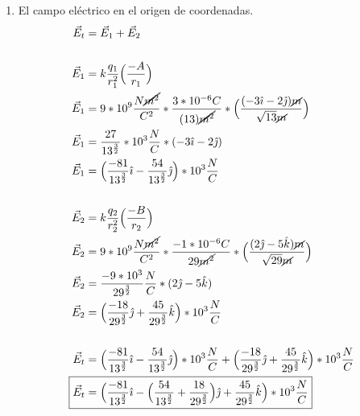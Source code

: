 \documentclass[12pt, twoside]{article}
\begin{document}
\begin{enumerate}
\begin{enumerate}
			\item El campo eléctrico en el origen de coordenadas.
				\begin{align*}
					\vec{E}_t &= \vec{E}_1 + \vec{E}_2\\
					\\
					\vec{E}_1 &= k \frac{q_1}{r_1^2}
					\Big{(}\frac{-A}{r_1}\Big{)}\\
					\vec{E}_1 &= 9*10^{9} \frac{N\cancel{\cancel{m^2}} }{C^2}*
					\frac{3*10^{-6}C}{(13)\cancel{\cancel{m^2} }}*
					\Big{(} \frac{(-3\hat{\imath}-2\hat{\jmath})\cancel{m}}{\sqrt{13}\cancel{m}} \Big{)}\\
					\vec{E}_1 &= \frac{27}{13^{ \frac{3}{2} }}*10^3\frac{N}{C}*
					(-3\hat{\imath}-2\hat{\jmath} )\\
					\vec{E}_1 &= \Big{(}
					\frac{-81}{13^{ \frac{3}{2} }}\hat{\imath}-
					\frac{54}{13^{ \frac{3}{2} }} \hat{\jmath}
					\Big{)}*10^3 \frac{N}{C}\\
					\\
					\vec{E}_2 &= k \frac{q_2}{r^2_2} \Big{(} \frac{-B}{r_2} \Big{)}\\
					\vec{E}_2 &= 9*10^9 \frac{N\cancel{m^2}}{C^2}*
					\frac{-1*10^{-6}C}{29\cancel{m^2}}*
					\Big{(} \frac{(2\hat{\jmath}-5\hat{k})\cancel{m}}{\sqrt{29}\cancel{m}} \Big{)}\\
					\vec{E}_2 &= \frac{-9*10^3}{29^{ \frac{3}{2} }}  \frac{N}{C}*
					(2\hat{\jmath}-5\hat{k})\\
					\vec{E}_2 &= \Big{(}
					\frac{-18}{29^{ \frac{3}{2} }}\hat{\jmath}+
					\frac{45}{29^{ \frac{3}{2} }}\hat{k}
					\Big{)}*10^3\frac{N}{C}\\
					\\
					\vec{E}_t &=  \Big{(}
					\frac{-81}{13^{ \frac{3}{2} }}\hat{\imath}-
					\frac{54}{13^{ \frac{3}{2} }} \hat{\jmath}
					\Big{)}*10^3\frac{N}{C}+
					\Big{(} \frac{-18}{29^{ \frac{3}{2} }}\hat{\jmath}+
					\frac{45}{29^{ \frac{3}{2} }}\hat{k}
					\Big{)}*10^3\frac{N}{C}\\
					\Aboxed
					{
						\vec{E}_t &= \Big{(}
						\frac{-81}{13^{ \frac{3}{2} }}\hat{\imath}-
						\Big{(} \frac{54}{13^{ \frac{3}{2} }}+
						\frac{18}{29^{ \frac{3}{2} }}
						\Big{)}\hat{\jmath}+
						\frac{45}{29^{ \frac{3}{2} }}\hat{k}
						\Big{)}*10^3 \frac{N}{C}
					}
				\end{align*}


\end{enumerate}
\end{enumerate}
\end{document}

